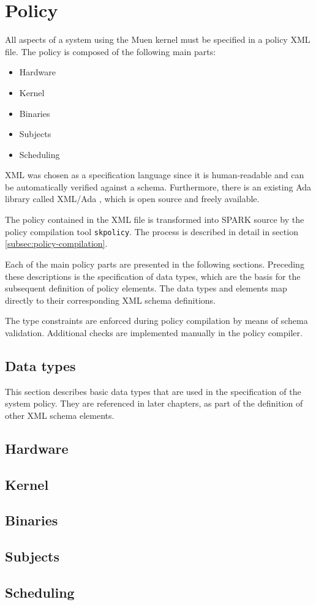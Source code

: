 \section{Policy}\label{sec:policy}
All aspects of a system using the Muen kernel must be specified in a policy XML
file. The policy is composed of the following main parts:

\begin{itemize}
	\item Hardware
	\item Kernel
	\item Binaries
	\item Subjects
	\item Scheduling
\end{itemize}

XML was chosen as a specification language since it is human-readable and can
be automatically verified against a schema. Furthermore, there is an existing
Ada library called XML/Ada \cite{xmlada}, which is open source and freely
available.

The policy contained in the XML file is transformed into SPARK source by the
policy compilation tool \texttt{skpolicy}. The process is described in detail in
section \ref{subsec:policy-compilation}.

Each of the main policy parts are presented in the following sections. Preceding
these descriptions is the specification of data types, which are the basis for
the subsequent definition of policy elements. The data types and elements map
directly to their corresponding XML schema definitions.

The type constraints are enforced during policy compilation by means of schema
validation. Additional checks are implemented manually in the policy compiler.

\subsection{Data types}
This section describes basic data types that are used in the specification of
the system policy. They are referenced in later chapters, as part of the
definition of other XML schema elements.



\subsection{Hardware}
\label{subsec:hardware}


\subsection{Kernel}


\subsection{Binaries}


\clearpage
\subsection{Subjects}\label{subsec:subjects}


\subsection{Scheduling}

